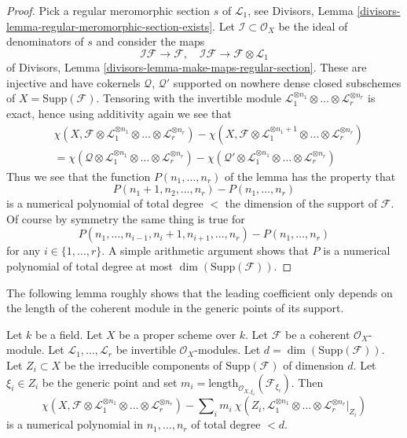 \begin{proof}
\medskip\noindent
Pick a regular meromorphic section $s$ of $\mathcal{L}_1$, see
Divisors, Lemma \ref{divisors-lemma-regular-meromorphic-section-exists}.
Let $\mathcal{I} \subset \mathcal{O}_X$ be the ideal of
denominators of $s$ and consider the maps
$$
\mathcal{I}\mathcal{F} \to \mathcal{F},\quad
\mathcal{I}\mathcal{F} \to \mathcal{F} \otimes \mathcal{L}_1
$$
of Divisors, Lemma \ref{divisors-lemma-make-maps-regular-section}.
These are injective and have cokernels $\mathcal{Q}$, $\mathcal{Q}'$
supported on nowhere dense closed subschemes of $X = \text{Supp}(\mathcal{F})$.
Tensoring with the invertible module
$\mathcal{L}_1^{\otimes n_1} \otimes \ldots \otimes \mathcal{L}_r^{\otimes n_r}$
is exact, hence using additivity again
we see that
\begin{align*}
&\chi(X, \mathcal{F} \otimes \mathcal{L}_1^{\otimes n_1} \otimes \ldots \otimes
\mathcal{L}_r^{\otimes n_r}) -
\chi(X, \mathcal{F} \otimes \mathcal{L}_1^{\otimes n_1 + 1}
\otimes \ldots \otimes \mathcal{L}_r^{\otimes n_r}) \\
& =
\chi(\mathcal{Q} \otimes \mathcal{L}_1^{\otimes n_1} \otimes \ldots \otimes
\mathcal{L}_r^{\otimes n_r}) -
\chi(\mathcal{Q}' \otimes \mathcal{L}_1^{\otimes n_1} \otimes \ldots \otimes
\mathcal{L}_r^{\otimes n_r})
\end{align*}
Thus we see that the function $P(n_1, \ldots, n_r)$ of the lemma has
the property that
$$
P(n_1 + 1, n_2, \ldots, n_r) - P(n_1, \ldots, n_r)
$$
is a numerical polynomial of total degree $<$ the dimension
of the support of $\mathcal{F}$. Of course by symmetry the same
thing is true for
$$
P(n_1, \ldots, n_{i - 1}, n_i + 1, n_{i + 1}, \ldots, n_r)
- P(n_1, \ldots, n_r)
$$
for any $i \in \{1, \ldots, r\}$. A simple arithmetic argument shows
that $P$ is a numerical polynomial of total degree at most
$\dim(\text{Supp}(\mathcal{F}))$.
\end{proof}

\noindent
The following lemma roughly shows that the leading coefficient only depends
on the length of the coherent module in the generic points of its
support.

\begin{lemma}
\label{lemma-numerical-polynomial-leading-term}
Let $k$ be a field. Let $X$ be a proper scheme over $k$. Let
$\mathcal{F}$ be a coherent $\mathcal{O}_X$-module. Let
$\mathcal{L}_1, \ldots, \mathcal{L}_r$ be invertible $\mathcal{O}_X$-modules.
Let $d = \dim(\text{Supp}(\mathcal{F}))$.
Let $Z_i \subset X$ be the irreducible components
of $\text{Supp}(\mathcal{F})$ of dimension $d$. Let $\xi_i \in Z_i$
be the generic point and set
$m_i = \text{length}_{\mathcal{O}_{X, \xi_i}}(\mathcal{F}_{\xi_i})$.
Then
$$
\chi(X, \mathcal{F} \otimes \mathcal{L}_1^{\otimes n_1} \otimes \ldots \otimes
\mathcal{L}_r^{\otimes n_r}) -
\sum\nolimits_i
m_i\ \chi(Z_i, \mathcal{L}_1^{\otimes n_1} \otimes \ldots \otimes
\mathcal{L}_r^{\otimes n_r}|_{Z_i})
$$
is a numerical polynomial in $n_1, \ldots, n_r$ of total degree $< d$.
\end{lemma}

